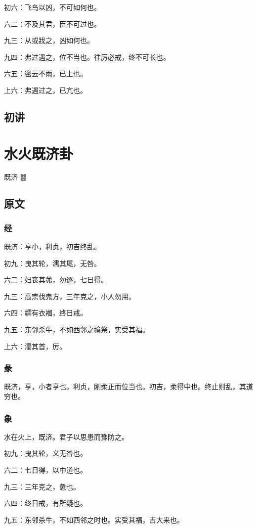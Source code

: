 \documentclass[12pt,oneside]{book}
\begin{document}
初六：飞鸟以凶，不可如何也。

六二：不及其君，臣不可过也。

九三：从或戕之，凶如何也。

九四：弗过遇之，位不当也。往厉必戒，终不可长也。

六五：密云不雨，已上也。

上六：弗遇过之，已亢也。

\section{初讲}



\chapter{水火既济卦}
既济 {\Large ䷾}
\section{原文}

\subsection{经}
既济：亨小，利贞，初吉终乱。

初九：曳其轮，濡其尾，无咎。

六二：妇丧其茀，勿逐，七日得。

九三：高宗伐鬼方，三年克之，小人勿用。

六四：繻有衣袽，终日戒。

九五：东邻杀牛，不如西邻之禴祭，实受其福。

上六：濡其首，厉。

\subsection{彖}
既济，亨，小者亨也。利贞，刚柔正而位当也。初吉，柔得中也。终止则乱，其道穷也。

\subsection{象}
水在火上，既济。君子以思患而豫防之。

初九：曳其轮，义无咎也。

六二：七日得，以中道也。

九三：三年克之，惫也。

六四：终日戒，有所疑也。

九五：东邻杀牛，不如西邻之时也。实受其福，吉大来也。
\end{document}
